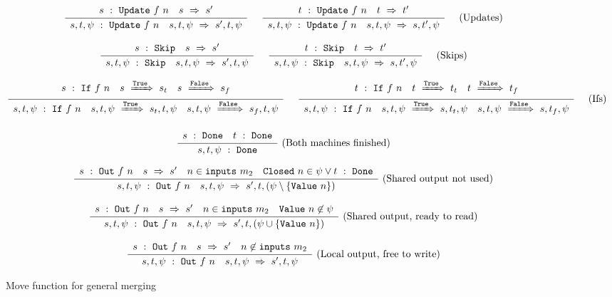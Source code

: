 
\begin{figure*}

$$
\frac {\displaystyle 
    \begin{array}{lr}  s ~:~ \mathtt{Update}~f~n  &  s ~\Rightarrow~ s'  \end{array}
} {\displaystyle 
    \begin{array}{lr}  s,t,\psi ~:~ \mathtt{Update}~f~n  &  s,t,\psi ~\Rightarrow~ s',t,\psi  \end{array}
} \ 
\quad
\frac {\displaystyle 
    \begin{array}{lr}  t ~:~ \mathtt{Update}~f~n  &  t ~\Rightarrow~ t'  \end{array}
} {\displaystyle 
    \begin{array}{lr}  s,t,\psi ~:~ \mathtt{Update}~f~n  &  s,t,\psi ~\Rightarrow~ s,t',\psi  \end{array}
} \ 
\quad
\textrm{(Updates)}
$$

$$
\frac {\displaystyle 
    \begin{array}{lr}  s ~:~ \mathtt{Skip}  &  s ~\Rightarrow~ s'  \end{array}
} {\displaystyle 
    \begin{array}{lr}  s,t,\psi ~:~ \mathtt{Skip}  &  s,t,\psi ~\Rightarrow~ s',t,\psi  \end{array}
} \ 
\quad
\frac {\displaystyle 
    \begin{array}{lr}  t ~:~ \mathtt{Skip}  &  t ~\Rightarrow~ t'  \end{array}
} {\displaystyle 
    \begin{array}{lr}  s,t,\psi ~:~ \mathtt{Skip}  &  s,t,\psi ~\Rightarrow~ s,t',\psi  \end{array}
} \ 
\quad
\textrm{(Skips)}
$$

$$
\frac {\displaystyle 
    \begin{array}{lcr}  s ~:~ \mathtt{If}~f~n  &  s ~\xRightarrow{\mathtt{True}}~ s_t  &  s ~\xRightarrow{\mathtt{False}}~ s_f  \end{array}
} {\displaystyle 
    \begin{array}{lcr}  s,t,\psi ~:~ \mathtt{If}~f~n  &  s,t,\psi ~\xRightarrow{\mathtt{True}}~ s_t,t,\psi  &  s,t,\psi ~\xRightarrow{\mathtt{False}}~ s_f,t,\psi  \end{array}
} \ 
\quad
\frac {\displaystyle 
    \begin{array}{lcr}  t ~:~ \mathtt{If}~f~n  &  t ~\xRightarrow{\mathtt{True}}~ t_t  &  t ~\xRightarrow{\mathtt{False}}~ t_f  \end{array}
} {\displaystyle 
    \begin{array}{lcr}  s,t,\psi ~:~ \mathtt{If}~f~n  &  s,t,\psi ~\xRightarrow{\mathtt{True}}~ s,t_t,\psi  &  s,t,\psi ~\xRightarrow{\mathtt{False}}~ s,t_f,\psi  \end{array}
} \ 
\quad
\textrm{(Ifs)}
$$

$$
\frac {\displaystyle 
    \begin{array}{lr}  s ~:~ \mathtt{Done}  &  t ~:~ \mathtt{Done}  \end{array}
} {\displaystyle 
        s,t,\psi ~:~ \mathtt{Done}
} \ 
\textrm{(Both machines finished)}
$$

$$
\frac {\displaystyle 
    \begin{array}{lccr}  s ~:~ \mathtt{Out}~f~n  &  s ~\Rightarrow~ s'  &  n \in \mathtt{inputs}~m_2  &  \mathtt{Closed}~n \in \psi \vee t ~:~ \mathtt{Done}  \end{array}
} {\displaystyle 
    \begin{array}{lr}  s,t,\psi ~:~ \mathtt{Out}~f~n  &  s,t,\psi ~\Rightarrow~ s',t,(\psi \setminus \{ \mathtt{Value}~n \})  \end{array}
} \ 
\textrm{(Shared output not used)}
$$

$$
\frac {\displaystyle 
    \begin{array}{lccr}  s ~:~ \mathtt{Out}~f~n  &  s ~\Rightarrow~ s'  &  n \in \mathtt{inputs}~m_2  &  \mathtt{Value}~n \not\in \psi  \end{array}
} {\displaystyle 
    \begin{array}{lr}  s,t,\psi ~:~ \mathtt{Out}~f~n  &  s,t,\psi ~\Rightarrow~ s',t,(\psi \cup \{ \mathtt{Value}~n \})  \end{array}
} \ 
\textrm{(Shared output, ready to read)}
$$

$$
\frac {\displaystyle 
    \begin{array}{lcr}  s ~:~ \mathtt{Out}~f~n  &  s ~\Rightarrow~ s'  &  n \not\in \mathtt{inputs}~m_2  \end{array}
} {\displaystyle 
    \begin{array}{lr}  s,t,\psi ~:~ \mathtt{Out}~f~n  &  s,t,\psi ~\Rightarrow~ s',t,\psi  \end{array}
} \ 
\textrm{(Local output, free to write)}
$$


\caption{Move function for general merging}
\label{fig:merge:general}
\end{figure*}


